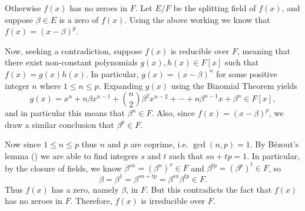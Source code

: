 \begin{questions}
    Otherwise $f(x)$ has no zeroes in $F$. Let $E/F$ be the splitting field of $f(x)$, and suppose $\beta \in E$ is a zero of $f(x)$. Using the above working we know that $f(x) = (x-\beta)^p$.
        
    Now, seeking a contradiction, suppose $f(x)$ is reducible over $F$, meaning that there exist non-constant polynomials $g(x), h(x) \in F[x]$ such that $f(x) = g(x)h(x)$. In particular, $g(x) = (x-\beta)^n$ for some positive integer $n$ where $1 \leq n \leq p$. Expanding $g(x)$ using the Binomial Theorem yields
    \[
        g(x) = x^n + n\beta x^{n-1} + {n\choose2}\beta^2x^{n-2} + \cdots + n\beta^{n-1}x + \beta^n \in F[x],
    \]
    and in particular this means that $\beta^n \in F$. Also, since $f(x) = (x-\beta)^p$, we draw a similar conclusion that $\beta^p \in F$.
    
    Now since $1 \leq n \leq p$ thus $n$ and $p$ are coprime, i.e. $\gcd(n,p) = 1$. By B\'ezout's lemma () we are able to find integers $s$ and $t$ such that $sn + tp = 1$. In particular, by the closure of fields, we know $\beta^{sn} = \left(\beta^n\right)^s \in F$ and $\beta^{tp} = \left(\beta^p\right)^t \in F$, so
    \[
        \beta = \beta^1 = \beta^{sn+tp} = \beta^{sn}\beta^{tp} \in F.
    \]
    Thus $f(x)$ has a zero, namely $\beta$, in $F$. But this contradicts the fact that $f(x)$ has no zeroes in $F$. Therefore, $f(x)$ is irreducible over $F$.
\end{questions}
